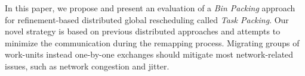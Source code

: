 In this paper, we propose and present an evaluation of a \textit{Bin Packing} approach for refinement-based distributed global rescheduling called \textit{Task Packing}.
Our novel strategy is based on previous distributed approaches and attempts to minimize the communication during the remapping process.
Migrating groups of work-units instead one-by-one exchanges should mitigate most network-related issues, such as network congestion and jitter.

